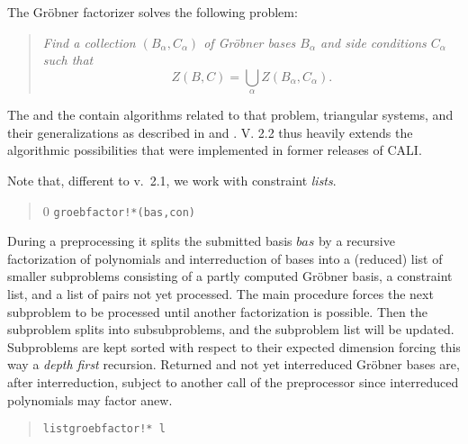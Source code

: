 The Gr\"obner factorizer solves the following problem:
\begin{quote}
\it Find a collection $(B_\alpha,C_\alpha)$ of Gr\"obner bases $B_\alpha$
and side conditions $C_\alpha$ such that 
\[Z(B,C) = \bigcup_\alpha Z(B_\alpha,C_\alpha).\]
\end{quote}
The  and the  contain algorithms
related to that problem, triangular systems, and their generalizations
as described in \cite{Graebe:94a} and \cite{Graebe:95b}. V. 2.2 thus heavily
extends the algorithmic possibilities that were implemented in former
releases of CALI. 

Note that, different to v.\ 2.1, we work with constraint \emph{lists}.
\begin{quote}0
\verb|groebfactor!*(bas,con)|

\end{quote}
During a preprocessing it splits the submitted basis $bas$ by a
recursive factorization of polynomials and interreduction of bases
into a (reduced) list of smaller subproblems consisting of a partly
computed Gr\"obner basis, a constraint list, and a list of pairs not yet
processed. The main procedure forces the next subproblem to be
processed until another factorization is possible. Then the
subproblem splits into subsubproblems, and the subproblem list will
be updated. Subproblems are kept sorted with respect to their
expected dimension  forcing this way a \emph{depth first}
recursion.  Returned and not yet interreduced Gr\"obner bases are, after
interreduction, subject to another call of the preprocessor since
interreduced polynomials may factor anew.
\begin{quote}
\verb|listgroebfactor!* l| 

\end{quote}
\medskip

